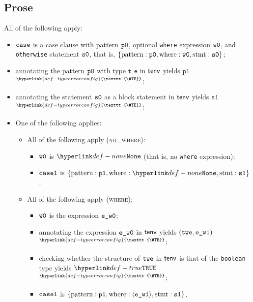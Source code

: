 \documentclass{book}
\newcommand\TypeErrorConfig[0]{\hyperlink{def-typeerrorconfig}{\texttt{\#TE}}}
\newcommand\ProseOrTypeError[0]{\hyperlink{def-proseortypeerror}{$^{\TypeErrorConfig}$}}
\newcommand\vte[0]{\texttt{t\_e}}
\newcommand\vsone[0]{\texttt{s1}}
\newcommand\vpone[0]{\texttt{p1}}
\begin{document}
\subsection{Prose}
All of the following apply:
\begin{itemize}
  \item $\texttt{case}$ is a case clause with pattern $\texttt{p0}$, optional \texttt{where} expression $\texttt{w0}$,
        and \texttt{otherwise} statement $\texttt{s0}$, that is,
        $\{ \text{pattern} : \texttt{p0}, \text{where} : \texttt{w0}, \text{stmt} : \texttt{s0} \}$;
  \item annotating the pattern $\texttt{p0}$ with type $\vte$ in $\textsf{tenv}$ yields $\vpone$ \ProseOrTypeError;
  \item annotating the statement $\texttt{s0}$ as a block statement in $\textsf{tenv}$ yields $\vsone$ \ProseOrTypeError;
  \item One of the following applies:
  \begin{itemize}
    \item All of the following apply (\textsc{no\_where}):
    \begin{itemize}
      \item $\texttt{w0}$ is $\None$ (that is, no \texttt{where} expression);
      \item $\texttt{case1}$ is $\{ \text{pattern} : \vpone, \text{where} : \None, \text{stmt} : \vsone \}$.
    \end{itemize}

    \item All of the following apply (\textsc{where}):
    \begin{itemize}
      \item $\texttt{w0}$ is the expression $\texttt{e\_w0}$;
      \item annotating the expression $\texttt{e\_w0}$ in $\textsf{tenv}$ yields $(\texttt{twe}, \texttt{e\_w1})$ \ProseOrTypeError;
      \item checking whether the structure of $\texttt{twe}$ in $\textsf{tenv}$ is that of the \texttt{boolean} type yields $\True$ \ProseOrTypeError;
      \item $\texttt{case1}$ is $\{ \text{pattern} : \vpone, \text{where} : \langle\vewone\rangle, \text{stmt} : \vsone \}$.
    \end{itemize}
  \end{itemize}
\end{itemize}
\end{document}
